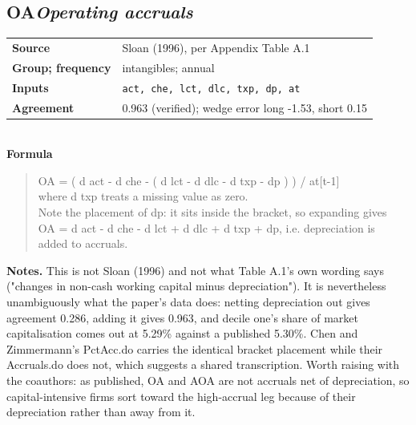 \documentclass[11pt]{article}
\begin{document}
\subsection*{OA\quad\normalfont\itshape Operating accruals}
\begin{tabular}{@{}p{3.3cm}p{12.3cm}@{}}
\textbf{Source} & Sloan (1996), per Appendix Table A.1\\
\textbf{Group; frequency} & intangibles; annual\\
\textbf{Inputs} & \texttt{act, che, lct, dlc, txp, dp, at}\\
\textbf{Agreement} & 0.963 (verified); wedge error long -1.53, short 0.15\\
\end{tabular}\\[4pt]
\textbf{Formula}
\begin{quote}\small
OA = ( d act - d che - ( d lct - d dlc - d txp - dp ) ) / at[t-1]\\
where d txp treats a missing value as zero.\\
Note the placement of dp: it sits inside the bracket, so expanding gives\\
OA = d act - d che - d lct + d dlc + d txp + dp, i.e. depreciation is\\
added to accruals.\\

\end{quote}
\textbf{Notes.} This is not Sloan (1996) and not what Table A.1's own wording says ("changes in non-cash working capital minus depreciation"). It is nevertheless unambiguously what the paper's data does: netting depreciation out gives agreement 0.286, adding it gives 0.963, and decile one's share of market capitalisation comes out at 5.29\% against a published 5.30\%. Chen and Zimmermann's PctAcc.do carries the identical bracket placement while their Accruals.do does not, which suggests a shared transcription. Worth raising with the coauthors: as published, OA and AOA are not accruals net of depreciation, so capital-intensive firms sort toward the high-accrual leg because of their depreciation rather than away from it.
\end{document}
